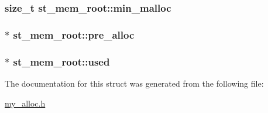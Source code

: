 \subsubsection[{min\+\_\+malloc}]{\setlength{\rightskip}{0pt plus 5cm}size\+\_\+t st\+\_\+mem\+\_\+root\+::min\+\_\+malloc}\label{structst__mem__root_ae20a32941b57232d2fcf86e94ebb289e}
\hypertarget{structst__mem__root_ac93aa644c9eae6a4260929234d460117}{}
\subsubsection[{pre\+\_\+alloc}]{$\ast$ st\+\_\+mem\+\_\+root\+::pre\+\_\+alloc}\label{structst__mem__root_ac93aa644c9eae6a4260929234d460117}
\hypertarget{structst__mem__root_a119bc46a5b34383d7a82c32d7c1b9077}{}
\subsubsection[{used}]{$\ast$ st\+\_\+mem\+\_\+root\+::used}\label{structst__mem__root_a119bc46a5b34383d7a82c32d7c1b9077}


The documentation for this struct was generated from the following file\+:\begin{DoxyCompactItemize}
\item 
\hyperlink{my__alloc_8h}{my\+\_\+alloc.\+h}\end{DoxyCompactItemize}
